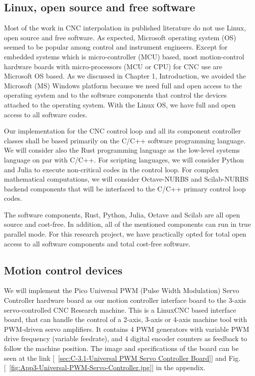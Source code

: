 \subsection{Linux, open source and free software}
Most of the work in CNC interpolation in published literature do not use Linux, open source and free software. As expected, Microsoft operating system (OS) seemed to be popular among control and instrument engineers. Except for embedded systems which is micro-controller (MCU) based, most motion-control hardware boards with micro-processors (MCU or CPU) for CNC use are Microsoft OS based. As we discussed in Chapter 1, Introduction, we avoided the Microsoft (MS) Windows platform because we need full and open access to the operating system and to the software components that control the devices attached to the operating system. With the Linux OS, we have full and open access to all software codes.
\vspace{0.5cm}

Our implementation for the CNC control loop and all its component controller classes shall be based primarily on the C/C++ software programming language. We will consider also the Rust programming language as the low-level systems language on par with C/C++. For scripting languages, we will consider Python and Julia to execute non-critical codes in the control loop. For complex mathematical computations, we will consider Octave-NURBS and Scilab-NURBS backend components that will be interfaced to the C/C++ primary control loop codes. 
\vspace{0.5cm}

The software components, Rust, Python, Julia, Octave and Scilab are all open source and cost-free. In addition, all of the mentioned components can run in true parallel mode. For this research project, we have practically opted for total open access to all software components and total cost-free software.

\subsection{Motion control devices}

We will implement the Pico Universal PWM (Pulse Width Modulation) Servo Controller hardware board as our motion controller interface board to the 3-axis servo-controlled CNC Research machine. This is a LinuxCNC based interface board, that can handle the control of a 2-axis, 3-axis or 4-axis machine tool with PWM-driven servo amplifiers. It contains 4 PWM generators with variable PWM drive frequency (variable feedrate), and 4 digital encoder counters as feedback to follow the machine position. The image and specifications of the board can be seen at the link [~\ref{sec:C-3.1-Universal PWM Servo Controller Board}] and Fig. [~\ref{fig:App3-Universal-PWM-Servo-Controller.jpg}] in the appendix.
\vspace{0.5cm}


